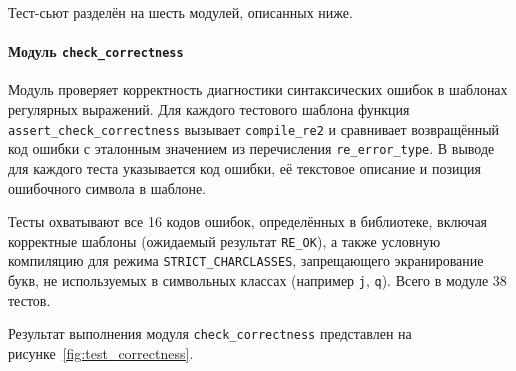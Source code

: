 Тест-сьют разделён на шесть модулей, описанных ниже.

\paragraph{Модуль \texttt{check\_correctness}}

Модуль проверяет корректность диагностики синтаксических ошибок в шаблонах регулярных выражений. Для каждого тестового шаблона функция \verb`assert_check_correctness` вызывает \verb`compile_re2` и сравнивает возвращённый код ошибки с эталонным значением из перечисления \verb`re_error_type`. В выводе для каждого теста указывается код ошибки, её текстовое описание и позиция ошибочного символа в шаблоне.

Тесты охватывают все 16 кодов ошибок, определённых в библиотеке, включая корректные шаблоны (ожидаемый результат \verb`RE_OK`), а также условную компиляцию для режима \verb`STRICT_CHARCLASSES`, запрещающего экранирование букв, не используемых в символьных классах (например \verb`j`, \verb`q`). Всего в модуле 38 тестов.

\renewcommand{\lstlistingname}{Рисунок}
\lstset{
	captionpos=b,                    %
	aboveskip=10pt,                  %
	belowskip=0pt,
}

\makeatletter
{}
\makeatother
\renewcommand{\thelstlisting}{\thesection.\arabic{lstlisting}}

\setcounter{lstlisting}{0}

Результат выполнения модуля \verb`check_correctness` представлен на рисунке~\ref{fig:test_correctness}.

